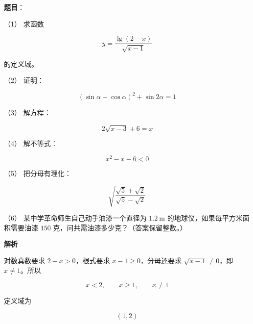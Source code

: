 \begin{answer}









\end{answer}
\begin{answer}

\textbf{题目}：

（1） 求函数

\nopagebreak[4]
\[
y=\frac{\lg(2-x)}{\sqrt{x-1}}
\]

的定义域。

（2） 证明：

\nopagebreak[4]
\[
(\sin\alpha-\cos\alpha)^2+\sin2\alpha=1
\]

（3） 解方程：

\nopagebreak[4]
\[
2\sqrt{x-3}+6=x
\]

（4） 解不等式：

\nopagebreak[4]
\[
x^2-x-6<0
\]

（5） 把分母有理化：

\nopagebreak[4]
\[
\sqrt{\frac{\sqrt5+\sqrt2}{\sqrt5-\sqrt2}}
\]

（6） 某中学革命师生自己动手油漆一个直径为 $1.2\ \mathrm m$ 的地球仪，如果每平方米面积需要油漆 $150$ 克，问共需油漆多少克？（答案保留整数。）

\textbf{解析}


对数真数要求 $2-x>0$，根式要求 $x-1\ge0$，分母还要求 $\sqrt{x-1}\ne0$，即 $x\ne1$。所以

\nopagebreak[4]
\[
x<2,\qquad x\ge1,\qquad x\ne1
\]

定义域为

\nopagebreak[4]
\[
(1,2)
\]



\end{answer}
